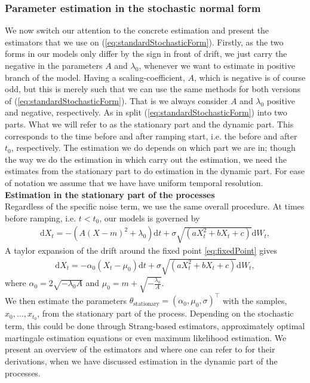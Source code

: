 \subsubsection{Parameter estimation in the stochastic normal form}
We now switch our attention to the concrete estimation and present the estimators that we use on (\ref{eq:standardStochasticForm}). Firstly, as the two forms in our models only differ by the sign in front of drift, we just carry the negative in the parameters $A$ and $\lambda_0$, whenever we want to estimate in positive branch of the model. Having a scaling-coefficient, $A$, which is negative is of course odd, but this is merely such that we can use the same methods for both versions of (\ref{eq:standardStochasticForm}). That is we always consider $A$ and $\lambda_0$ positive and negative, respectively. As in \cite{Ditlevsen2023} split (\ref{eq:standardStochasticForm}) into two parts. What we will refer to as the stationary part and the dynamic part. This corresponds to the time before and after ramping start, i.e. the before and after $t_0$, respectively. The estimation we do depends on which part we are in; though the way we do the estimation in which carry out the estimation, we need the estimates from the stationary part to do estimation in the dynamic part. For ease of notation we assume that we have have uniform temporal resolution. \\
\textbf{Estimation in the stationary part of the processes}\\
Regardless of the specific noise term, we use the same overall procedure. At times before ramping, i.e. $t < t_0$, our models is governed by
\begin{align}
    \mathrm{d}X_t = -\left(A(X - m)^2 + \lambda_0\right)\mathrm{d}t + \sigma\sqrt{\left(aX_t^2 + bX_t + c\right)}\mathrm{d}W_t, 
\end{align}
A taylor expansion of the drift around the fixed point \ref{eq:fixedPoint} gives
\begin{align}
    \mathrm{d}X_t = -\alpha_0\left(X_t - \mu_0\right)\mathrm{d}t + \sigma\sqrt{\left(aX_t^2 + bX_t + c\right)}\mathrm{d}W_t, 
\end{align}
where $\alpha_0 = 2\sqrt{-\lambda_0 A}$ and $\mu_0 = m + \sqrt{-\frac{\lambda_0}{A}}$.\\ We then estimate the parameters $\theta_{\mathrm{stationary}} = (\alpha_0, \mu_0, \sigma)^\top$ with the samples, $x_{0}, \dots, x_{t_0}$, from the stationary part of the process. Depending on the stochastic term, this could be done through Strang-based estimators, approximately optimal martingale estimation equations or even maximum likelihood estimation. We present an overview of the estimators and where one can refer to for their derivations, when we have discussed estimation in the dynamic part of the processes.\\
